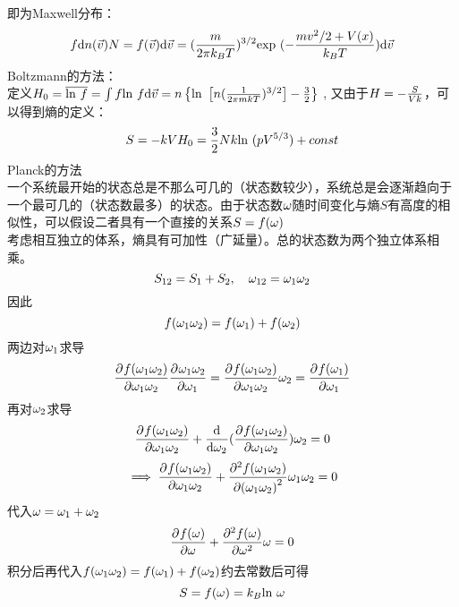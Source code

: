 \documentclass[UTF8,9pt]{ctexart}
\begin{document}
    即为Maxwell分布：
    $$f{\d n(\vec{v})}{N}=f(\vec{v})\d \vec v =(\f{m}{2\pi k_BT})^{3/2}\exp (-\f{mv^2/2+V(x)}{k_BT})\d \vec v$$
    Boltzmann的方法：\\
    定义$H_0=\bar{\ln f}=\int f\ln f\d\vec v= n\left\{\ln\left[n(\ff{2\pi mkT})^{3/2}\right]-\f{3}{2}\right\}$ , 又由于$H=-\f{S}{Vk}$，可以得到熵的定义：
    $$S=-kVH_0=\f{3}{2}Nk\ln (pV^{5/3})+const$$
    Planck的方法\\
    一个系统最开始的状态总是不那么可几的（状态数较少），系统总是会逐渐趋向于一个最可几的（状态数最多）的状态。由于状态数$\o$随时间变化与熵$S$有高度的相似性，可以假设二者具有一个直接的关系$S=f(\o)$\\
    考虑相互独立的体系，熵具有可加性（广延量）。总的状态数为两个独立体系相乘。
    $$S_{12}=S_1+S_2,\quad \o_{12}=\o_1\o_2$$
    因此
    $$f(\o_1\o_2)=f(\o_1)+f(\o_2)$$
    两边对$\o_1$求导
    $$\pp{f(\o_1\o_2)}{\o_1\o_2}\pp{\o_1\o_2}{\o_1}=\pp{f(\o_1\o_2)}{\o_1\o_2}\o_2=\pp{f(\o_1)}{\o_1}$$
    再对$\o_2$求导
    $$\pp{f(\o_1\o_2)}{\o_1\o_2}+\dd{}{\o_2}(\pp{f(\o_1\o_2)}{\o_1\o_2})\o_2=0$$
    $$\ip \pp{f(\o_1\o_2)}{\o_1\o_2}+\pp[2]{f(\o_1\o_2)}{(\o_1\o_2)}\o_1\o_2=0$$
    代入$\o=\o_1+\o_2$
    $$\pp{f(\o)}{\o}+\pp[2]{f(\o)}{\o}\o=0$$
    积分后再代入$f(\o_1\o_2)=f(\o_1)+f(\o_2)$约去常数后可得
    $$S=f(\o)=k_B\ln \o$$
\end{document}

